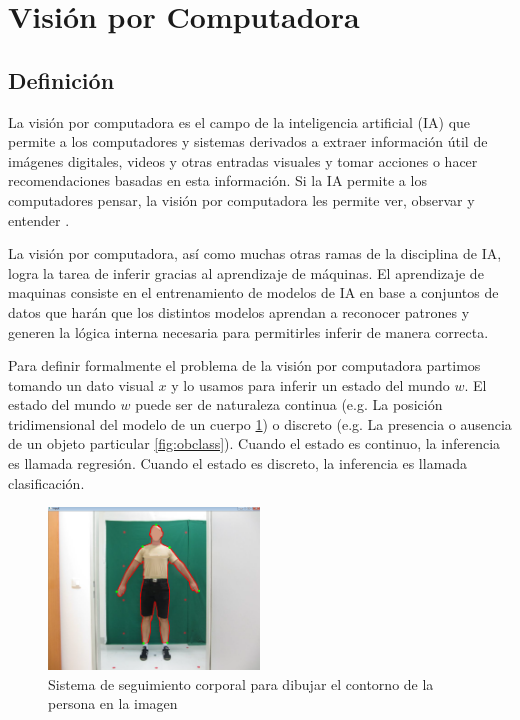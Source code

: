 \documentclass[letter,12pt]{report}
\begin{document}
\section{Visión por Computadora}
\subsection{Definición}
La visión por computadora es el campo de la inteligencia artificial (IA) que permite a
los computadores y sistemas derivados a extraer información útil de imágenes digitales,
videos y otras entradas visuales y tomar acciones o hacer recomendaciones basadas en esta
información. Si la IA permite a los computadores pensar, la visión por computadora les
permite ver, observar y entender \cite{IBM}.

La visión por computadora, así como muchas otras ramas de la disciplina de IA, logra la
tarea de inferir gracias al aprendizaje de máquinas. El aprendizaje de maquinas consiste
en el entrenamiento de modelos de IA en base a conjuntos de datos que harán que los
distintos modelos aprendan a reconocer patrones y generen la lógica interna necesaria
para permitirles inferir de manera correcta.

Para definir formalmente el problema de la visión por computadora \cite{Prince} partimos
tomando un dato visual $x$ y lo usamos para inferir un estado del mundo $w$. El estado
del mundo $w$ puede ser de naturaleza continua (e.g. La posición tridimensional del
modelo de un cuerpo \ref{fig:body}) o discreto (e.g. La presencia o ausencia de un objeto
particular \ref{fig:obclass}).  Cuando el estado es continuo, la inferencia es llamada
regresión. Cuando el estado es discreto, la inferencia es llamada clasificación.

\begin{figure}[H]
    \centering
    \includegraphics[width=0.5\textwidth]{body}
    \caption{Sistema de seguimiento corporal para dibujar el contorno de la persona en la
    imagen}
    \label{fig:body}
\end{figure}
\end{document}
